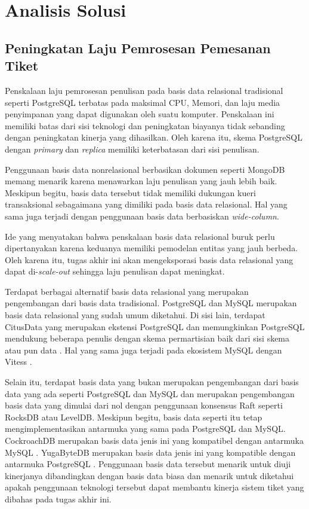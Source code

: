 \section{Analisis Solusi}

\subsection{Peningkatan Laju Pemrosesan Pemesanan Tiket}

Penskalaan laju pemrosesan penulisan pada basis data relasional tradisional seperti PostgreSQL terbatas pada maksimal CPU, Memori, dan laju media penyimpanan yang dapat digunakan oleh suatu komputer. Penskalaan ini memiliki batas dari sisi teknologi dan peningkatan biayanya tidak sebanding dengan peningkatan kinerja yang dihasilkan. Oleh karena itu, skema PostgreSQL dengan \textit{primary} dan \textit{replica} memiliki keterbatasan dari sisi penulisan.

Penggunaan basis data nonrelasional berbasikan dokumen seperti MongoDB memang menarik karena menawarkan laju penulisan yang jauh lebih baik. Meskipun begitu, basis data tersebut tidak memiliki dukungan kueri transaksional sebagaimana yang dimiliki pada basis data relasional. Hal yang sama juga terjadi dengan penggunaan basis data berbasiskan \textit{wide-column}.

Ide yang menyatakan bahwa penskalaan basis data relasional buruk perlu dipertanyakan karena keduanya memiliki pemodelan entitas yang jauh berbeda. Oleh karena itu, tugas akhir ini akan mengeksporasi basis data relasional yang dapat di-\textit{scale-out} sehingga laju penulisan dapat meningkat.

Terdapat berbagai alternatif basis data relasional yang merupakan pengembangan dari basis data tradisional. PostgreSQL dan MySQL merupakan basis data relasional yang sudah umum diketahui. Di sisi lain, terdapat CitusData yang merupakan ekstensi PostgreSQL dan memungkinkan PostgreSQL mendukung beberapa penulis dengan skema permartisian baik dari sisi skema atau pun data \parencite{citus}. Hal yang sama juga terjadi pada ekosistem MySQL dengan Vitess \parencite{vitess}.

Selain itu, terdapat basis data yang bukan merupakan pengembangan dari basis data yang ada seperti PostgreSQL dan MySQL dan merupakan pengembangan basis data yang dimulai dari nol dengan penggunaan konsensus Raft seperti RocksDB atau LevelDB. Meskipun begitu, basis data seperti itu tetap mengimplementasikan antarmuka yang sama pada PostgreSQL dan MySQL. CockroachDB merupakan basis data jenis ini yang kompatibel dengan antarmuka MySQL \parencite{cockroachDB}. YugaByteDB merupakan basis data jenis ini yang kompatible dengan antarmuka PostgreSQL \parencite{yugabyte}. Penggunaan basis data tersebut menarik untuk diuji kinerjanya dibandingkan dengan basis data biasa dan menarik untuk diketahui apakah penggunaan teknologi tersebut dapat membantu kinerja sistem tiket yang dibahas pada tugas akhir ini.

